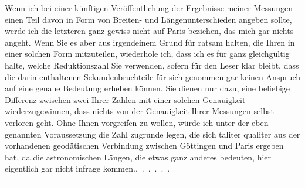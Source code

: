\par\noindent\hspace*{\parindent}Wenn ich bei einer künftigen Veröffentlichung der Ergebnisse meiner Messungen einen Teil davon in Form von Breiten- und Längenunterschieden angeben sollte, werde ich die letzteren ganz gewiss nicht auf Paris beziehen, das mich gar nichts angeht. Wenn Sie es aber aus irgendeinem Grund für ratsam halten, die Ihren in einer solchen Form mitzuteilen, wiederhole ich, dass ich es für ganz gleichgültig halte, welche Reduktionszahl Sie verwenden, sofern für den Leser klar bleibt, dass die darin enthaltenen Sekundenbruchteile für sich genommen gar keinen Anspruch auf eine genaue Bedeutung erheben können. Sie dienen nur dazu, eine beliebige Differenz zwischen zwei Ihrer Zahlen mit einer solchen Genauigkeit wiederzugewinnen, dass nichts von der Genauigkeit Ihrer Messungen selbst verloren geht. Ohne Ihnen vorgreifen zu wollen, würde ich unter der eben genannten Voraussetzung die Zahl zugrunde legen, die sich taliter qualiter aus der vorhandenen geodätischen Verbindung zwischen Göttingen und Paris ergeben hat, da die astronomischen Längen, die etwas ganz anderes bedeuten, hier eigentlich gar nicht infrage kommen.\quad\mbox{.\ .\ .\ .\ .\ .}
\begin{center}\rule{.12\linewidth}{.4pt}\end{center}

